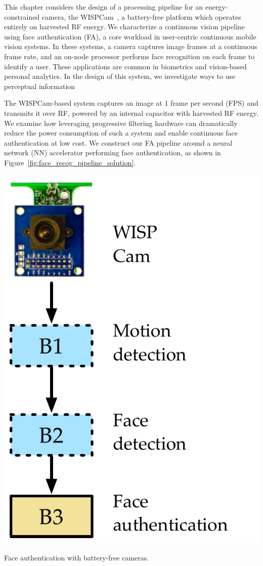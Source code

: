 
\label{sec:nsp-face-auth}

This chapter considers the design of a processing pipeline for an energy-constrained camera, the WISPCam~\cite{wispcam}, a battery-free platform which operates entirely on harvested RF energy.
We characterize a continuous vision pipeline using face authentication (FA), a core workload in user-centric continuous mobile vision systems.
In these systems, a camera captures image frames at a continuous frame rate, and an on-node processor performs face recognition on each frame to identify a user.
These applications are common in biometrics and vision-based personal analytics.
In the design of this system, we investigate ways to use perceptual information


The WISPCam-based system captures an image at 1 frame per second (FPS) and transmits it over RF, powered by an internal capacitor with harvested RF energy.
We examine how leveraging progressive filtering hardware can dramatically reduce the power consumption of such a system and enable continuous face authentication at low cost.
We construct our FA pipeline around a neural network (NN) accelerator performing face authentication, as shown in Figure~\ref{fig:face_recog_pipeline_solution}.


\begin{marginfigure}
  \includegraphics[width=.8\textwidth]{nsp-figs/FA_pipeline_base_with_example.pdf}
  \caption{Face authentication with battery-free cameras. }
  \label{fig:face_recog_pipeline_solution}
\end{marginfigure}

